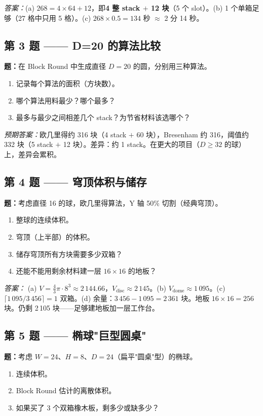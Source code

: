 \documentclass[12pt,a4paper]{scrartcl}
\newcommand{\acc}[1]{\textcolor{accent}{\textbf{#1}}}
\begin{document}
\emph{答案：}(a) $268 = 4 \times 64 + 12$，即\acc{4 整 stack $+$ 12 块}（5 个 slot）。(b) 1 个单箱足够（27 格中只用 5 格）。(c) $268 \times 0.5 = 134$ 秒 $\approx$ 2 分 14 秒。

\subsection*{第 3 题 —— D=20 的算法比较}
\textbf{题：}在 Block Round 中生成直径 $D = 20$ 的圆，分别用三种算法。
\begin{enumerate}[label=\alph*),leftmargin=1.5em,itemsep=0.1em,topsep=0.2em,nosep]
  \item 记录每个算法的面积（方块数）。
  \item 哪个算法用料最少？哪个最多？
  \item 最多与最少之间相差几个 stack？为节省材料该选哪个？
\end{enumerate}

\emph{预期答案：}欧几里得约 316 块（4 stack $+$ 60 块），Bresenham 约 316，阈值约 332 块（5 stack $+$ 12 块）。差异：约 1 stack。在更大的项目（$D \geq 32$ 的球）上，差异会累积。

\subsection*{第 4 题 —— 穹顶体积与储存}
\textbf{题：}考虑直径 16 的球，欧几里得算法，Y 轴 50\% 切割（经典穹顶）。
\begin{enumerate}[label=\alph*),leftmargin=1.5em,itemsep=0.1em,topsep=0.2em,nosep]
  \item 整球的连续体积。
  \item 穹顶（上半部）的体积。
  \item 储存穹顶所有方块需要多少双箱？
  \item 还能不能用剩余材料建一层 $16 \times 16$ 的地板？
\end{enumerate}

\emph{答案：}
(a) $V = \tfrac{4}{3}\pi \cdot 8^3 \approx 2\,144.66$，$V_{\mathrm{disc}} \approx 2\,145$。(b) $V_{\mathrm{dome}} \approx 1\,095$。(c) $\lceil 1\,095 / 3\,456 \rceil = 1$ 双箱。(d) 余量：$3\,456 - 1\,095 = 2\,361$ 块。地板 $16 \times 16 = 256$ 块。仍剩 2\,105 块——足够建地板加一层工作台。

\subsection*{第 5 题 —— 椭球"巨型圆桌"}
\textbf{题：}考虑 $W = 24$、$H = 8$、$D = 24$（扁平"圆桌"型）的椭球。
\begin{enumerate}[label=\alph*),leftmargin=1.5em,itemsep=0.1em,topsep=0.2em,nosep]
  \item 连续体积。
  \item Block Round 估计的离散体积。
  \item 如果买了 3 个双箱橡木板，剩多少或缺多少？
\end{enumerate}
\end{document}
